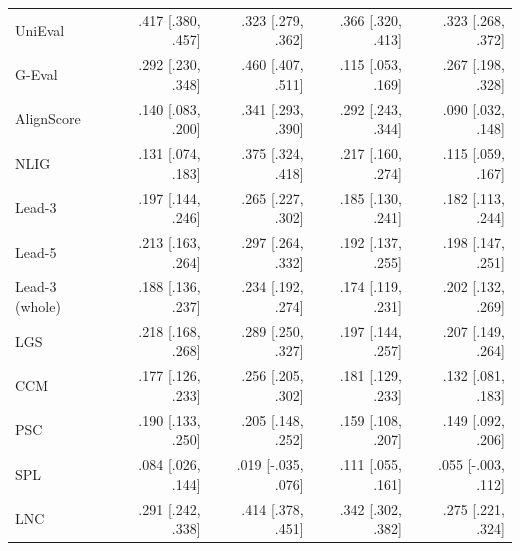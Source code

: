 \begin{table}[t]
\begin{tabular}{@{}lrrrr@{}}
UniEval & .417 {\scriptsize [.380, .457]} & .323 {\scriptsize [.279, .362]} & .366 {\scriptsize [.320, .413]} & .323 {\scriptsize [.268, .372]} \\
G-Eval & .292 {\scriptsize [.230, .348]} & .460 {\scriptsize [.407, .511]} & .115 {\scriptsize [.053, .169]} & .267 {\scriptsize [.198, .328]} \\
AlignScore & .140 {\scriptsize [.083, .200]} & .341 {\scriptsize [.293, .390]} & .292 {\scriptsize [.243, .344]} & .090 {\scriptsize [.032, .148]} \\
NLIG & .131 {\scriptsize [.074, .183]} & .375 {\scriptsize [.324, .418]} & .217 {\scriptsize [.160, .274]} & .115 {\scriptsize [.059, .167]} \\
Lead-3 & .197 {\scriptsize [.144, .246]} & .265 {\scriptsize [.227, .302]} & .185 {\scriptsize [.130, .241]} & .182 {\scriptsize [.113, .244]} \\
Lead-5 & .213 {\scriptsize [.163, .264]} & .297 {\scriptsize [.264, .332]} & .192 {\scriptsize [.137, .255]} & .198 {\scriptsize [.147, .251]} \\
Lead-3 (whole) & .188 {\scriptsize [.136, .237]} & .234 {\scriptsize [.192, .274]} & .174 {\scriptsize [.119, .231]} & .202 {\scriptsize [.132, .269]} \\
LGS & .218 {\scriptsize [.168, .268]} & .289 {\scriptsize [.250, .327]} & .197 {\scriptsize [.144, .257]} & .207 {\scriptsize [.149, .264]} \\
CCM & .177 {\scriptsize [.126, .233]} & .256 {\scriptsize [.205, .302]} & .181 {\scriptsize [.129, .233]} & .132 {\scriptsize [.081, .183]} \\
PSC & .190 {\scriptsize [.133, .250]} & .205 {\scriptsize [.148, .252]} & .159 {\scriptsize [.108, .207]} & .149 {\scriptsize [.092, .206]} \\
SPL & .084 {\scriptsize [.026, .144]} & .019 {\scriptsize [-.035, .076]} & .111 {\scriptsize [.055, .161]} & .055 {\scriptsize [-.003, .112]} \\
LNC & .291 {\scriptsize [.242, .338]} & .414 {\scriptsize [.378, .451]} & .342 {\scriptsize [.302, .382]} & .275 {\scriptsize [.221, .324]} \\
\bottomrule
\end{tabular}
\end{table}
